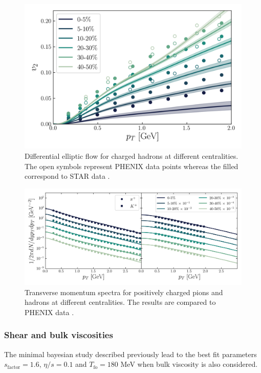 \begin{figure}[H]
	\includegraphics[width=\textwidth]{images/vn_pt.png}
	\caption{\normalsize Differential elliptic flow for charged hadrons at different centralities. The open symbols represent {\sffamily PHENIX} data points \cite{Adare:2011tg} whereas the filled correspond to {\sffamily STAR} data \cite{Adams:2004bi}.} 
\end{figure}

\begin{figure}[!h]
	\includegraphics{images/plot_ptspectra_shear.png}
	\caption{\normalsize Transverse momentum spectra for positively charged pions and hadrons at different centralities. The results are compared to {\sffamily PHENIX} data \cite{Adler:2003cb}.}
\end{figure}

\subsubsection*{Shear and bulk viscosities}
The minimal bayesian study described previously lead to the best fit parameters $s_\text{factor}=1.6$, $\eta/s=0.1$ and $T_\text{fo}=180$ MeV when bulk viscosity is also considered.

